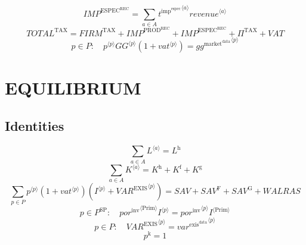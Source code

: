 \begin{equation}
{I\!M\!P}^{\mathrm{ESPEC}^{\mathrm{REC}}} = \sum_{a\in A} {{t^{\mathrm{imp}^{\mathrm{espec}}}}^{\langle a\rangle}} {{{r\!e\!v\!e\!n\!u\!e}}^{\langle a\rangle}}
\end{equation}
\begin{equation}
{T\!O\!T\!A\!L}^{\mathrm{TAX}} = {F\!I\!R\!M}^{\mathrm{TAX}} + {I\!M\!P}^{\mathrm{PROD}^{\mathrm{REC}}} + {I\!M\!P}^{\mathrm{ESPEC}^{\mathrm{REC}}} + \Pi^{\mathrm{TAX}} + {V\!A\!T}
\end{equation}
\begin{equation}
p\in P\colon\quad {{p}^{\langle p\rangle}} {{{G\!G}}^{\langle p\rangle}} \left(1 + {{v\!a\!t}}^{\langle p\rangle}\right) = {{g\!g}^{\mathrm{market}^{\mathrm{data}}}}^{\langle p\rangle}
\end{equation}




\section{EQUILIBRIUM}

\subsection{Identities}

\begin{equation}
\sum_{a\in A} {L}^{\langle a\rangle} = L^{\mathrm{h}}
\end{equation}
\begin{equation}
\sum_{a\in A} {K}^{\langle a\rangle} = K^{\mathrm{h}} + K^{\mathrm{f}} + K^{\mathrm{g}}
\end{equation}
\begin{equation}
\sum_{p\in P} {{p}^{\langle p\rangle}} \left(1 + {{v\!a\!t}}^{\langle p\rangle}\right) \left({I}^{\langle p\rangle} + {{V\!A\!R}^{\mathrm{EXIS}}}^{\langle p\rangle}\right) = {S\!A\!V} + {S\!A\!V}^{\mathrm{F}} + {S\!A\!V}^{\mathrm{G}} + {W\!A\!L\!R\!A\!S}
\end{equation}
\begin{equation}
p\in P^{\mathrm{SP}}\colon\quad {{{p\!o\!r}^{\mathrm{inv}}}^{\langle \mathrm{\mathrm{Prim}}\rangle}} {{I}^{\langle p\rangle}} = {{{p\!o\!r}^{\mathrm{inv}}}^{\langle p\rangle}} {{I}^{\langle \mathrm{Prim}\rangle}}
\end{equation}
\begin{equation}
p\in P\colon\quad {{V\!A\!R}^{\mathrm{EXIS}}}^{\langle p\rangle} = {{v\!a\!r}^{\mathrm{exis}^{\mathrm{data}}}}^{\langle p\rangle}
\end{equation}
\begin{equation}
p^{\mathrm{k}} = 1
\end{equation}




